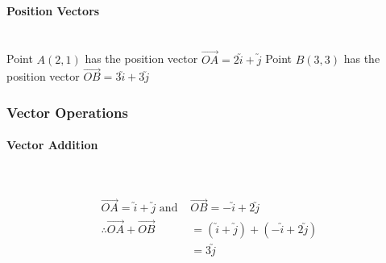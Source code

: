 \documentclass[a4paper]{article}
\begin{document}
				\paragraph{Position Vectors}\mbox{}\\
					Point $A(2,1)$ has the position vector $\overrightarrow{OA}=2\utilde{i}+\utilde{j}$ \newline
					Point $B(3,3)$ has the position vector $\overrightarrow{OB}=3\utilde{i}+3\utilde{j}$
			\subsubsection{Vector Operations}
				\paragraph{Vector Addition}\mbox{}\\
					\begin{minipage}{0.5\textwidth}
						\vspace{0pt}
						\begin{align*}
							\overrightarrow{OA}=\utilde{i}+\utilde{j}\text{ and }&\overrightarrow{OB}=-\utilde{i}+2\utilde{j} \\
							\therefore \overrightarrow{OA}+\overrightarrow{OB}&=(\utilde{i}+\utilde{j})+(-\utilde{i}+2\utilde{j}) \\
							&=3\utilde{j}
						\end{align*}
					\end{minipage}
\end{document}
